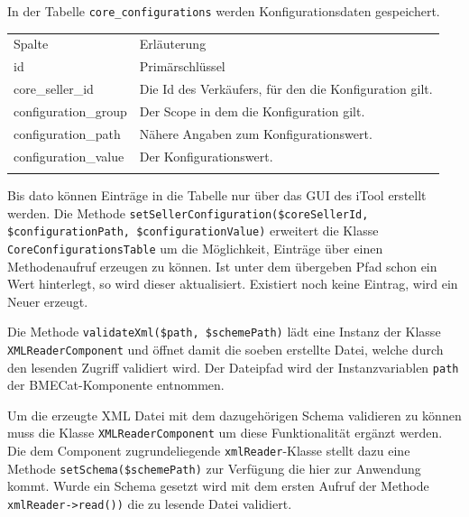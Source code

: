 {	\pagebreak	
	 In der Tabelle \texttt{core\_configurations} werden Konfigurationsdaten gespeichert. 	 
	 \begin{table}[!htbp]

	 \centering
		 		\begin{tabularx}{\linewidth}{p{6cm} X}
		 		\rowcolor[HTML]{EFEFEF} 
		 		Spalte & Erläuterung \\ \cline{1-2} \addlinespace[7pt]
		 		id & Primärschlüssel \\
		 		core\_seller\_id & Die Id des Verkäufers, für den die Konfiguration gilt. \\
		 		configuration\_group & Der Scope in dem die Konfiguration gilt. \\
		 		configuration\_path & Nähere Angaben zum Konfigurationswert. \\
		 		configuration\_value & Der Konfigurationswert. \\\addlinespace[7pt] \cline{1-2} 
		 		\end{tabularx}%
		
		 	\end{table}
	 
	 Bis dato können Einträge in die Tabelle nur über das GUI des iTool erstellt werden. Die Methode \texttt{setSellerConfiguration(\$coreSellerId, \$configurationPath, \$configurationValue)} erweitert die Klasse \texttt{CoreConfigurationsTable} um die Möglichkeit, Einträge über einen Methodenaufruf erzeugen zu können. Ist unter dem übergeben Pfad schon ein Wert hinterlegt, so wird dieser aktualisiert. Existiert noch keine Eintrag, wird ein Neuer erzeugt.
	
	
	Die Methode \texttt{validateXml(\$path, \$schemePath)} lädt eine Instanz der Klasse \texttt{XMLReaderComponent} und öffnet damit die soeben erstellte Datei, welche durch den lesenden Zugriff validiert wird. Der Dateipfad wird der Instanzvariablen \texttt{path} der BMECat-Komponente entnommen.
	


		Um die erzeugte XML Datei mit dem dazugehörigen Schema validieren zu können muss die Klasse \texttt{XMLReaderComponent} um diese Funktionalität ergänzt werden. Die dem Component zugrundeliegende \texttt{xmlReader}-Klasse stellt dazu eine Methode \texttt{setSchema(\$schemePath)} zur Verfügung die hier zur Anwendung kommt. Wurde ein Schema gesetzt wird mit dem ersten Aufruf der Methode \texttt{xmlReader->read())} die zu lesende Datei validiert. 

}

